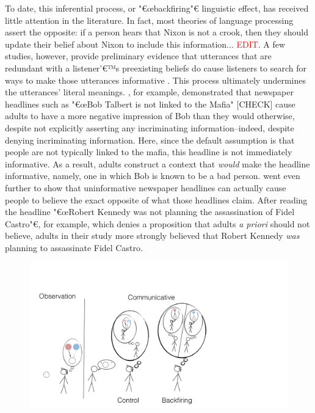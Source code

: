 \documentclass[10pt,letterpaper]{article}
\newcommand{\red}[1]{\textcolor{Red}{#1}}
\begin{document}
To date, this inferential process, or "€œbackfiring"€ linguistic effect, has received little attention in the literature.  In fact, most theories of language processing assert the opposite: if a person hears that Nixon is not a crook, then they should update their belief about Nixon to include this information... \red{EDIT}.  A few studies, however, provide preliminary evidence that utterances that are redundant with a listener'€™s preexisting beliefs do cause listeners to search for ways to make those utterances informative \cite{Yandell1979, Wegner1981, Gruenfeld1992, Kravtchenko2015}.  This process ultimately undermines the utterances' literal meanings.  
, for example, demonstrated that newspaper headlines such as "€œBob Talbert is not linked to the Mafia" [CHECK] cause adults to have a more negative impression of Bob than they would otherwise, despite not explicitly asserting any incriminating information--indeed, despite denying incriminating information.  Here, since the default assumption is that people are not typically linked to the mafia, this headline is not immediately informative.  As a result, adults construct a context that \emph{would} make the headline informative, namely, one in which Bob is known to be a bad person.  
 went even further to show that uninformative newspaper headlines can actually cause people to believe the exact opposite of what those headlines claim.  After reading the headline "€œRobert Kennedy was not planning the assassination of Fidel Castro"€, for example, which denies a proposition that adults \emph{a priori} should not believe, adults in their study more strongly believed that Robert Kennedy \emph{was} planning to assassinate Fidel Castro.


\begin{figure}
\centering
    \includegraphics[width=\columnwidth]{cartoon}
    \caption{}
  \label{fig:cartoon}
\end{figure}
\end{document}
